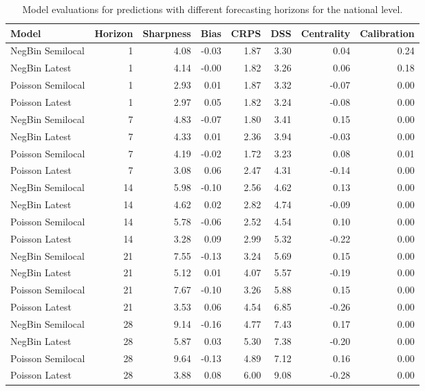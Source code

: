 \begin{table}[ht]
\centering
\begin{tabular}{lrrrrrrr}
 Model & Horizon & Sharpness & Bias & CRPS & DSS & Centrality & Calibration \\ 
  \hline
NegBin Semilocal &   1 & 4.08 & -0.03 & 1.87 & 3.30 & 0.04 & 0.24 \\ 
  NegBin Latest &   1 & 4.14 & -0.00 & 1.82 & 3.26 & 0.06 & 0.18 \\ 
  Poisson Semilocal &   1 & 2.93 & 0.01 & 1.87 & 3.32 & -0.07 & 0.00 \\ 
  Poisson Latest &   1 & 2.97 & 0.05 & 1.82 & 3.24 & -0.08 & 0.00 \\ 
   \hline
NegBin Semilocal &   7 & 4.83 & -0.07 & 1.80 & 3.41 & 0.15 & 0.00 \\ 
  NegBin Latest &   7 & 4.33 & 0.01 & 2.36 & 3.94 & -0.03 & 0.00 \\ 
  Poisson Semilocal &   7 & 4.19 & -0.02 & 1.72 & 3.23 & 0.08 & 0.01 \\ 
  Poisson Latest &   7 & 3.08 & 0.06 & 2.47 & 4.31 & -0.14 & 0.00 \\ 
   \hline
NegBin Semilocal &  14 & 5.98 & -0.10 & 2.56 & 4.62 & 0.13 & 0.00 \\ 
  NegBin Latest &  14 & 4.62 & 0.02 & 2.82 & 4.74 & -0.09 & 0.00 \\ 
  Poisson Semilocal &  14 & 5.78 & -0.06 & 2.52 & 4.54 & 0.10 & 0.00 \\ 
  Poisson Latest &  14 & 3.28 & 0.09 & 2.99 & 5.32 & -0.22 & 0.00 \\ 
   \hline
NegBin Semilocal &  21 & 7.55 & -0.13 & 3.24 & 5.69 & 0.15 & 0.00 \\ 
  NegBin Latest &  21 & 5.12 & 0.01 & 4.07 & 5.57 & -0.19 & 0.00 \\ 
  Poisson Semilocal &  21 & 7.67 & -0.10 & 3.26 & 5.88 & 0.15 & 0.00 \\ 
  Poisson Latest &  21 & 3.53 & 0.06 & 4.54 & 6.85 & -0.26 & 0.00 \\ 
   \hline
NegBin Semilocal &  28 & 9.14 & -0.16 & 4.77 & 7.43 & 0.17 & 0.00 \\ 
  NegBin Latest &  28 & 5.87 & 0.03 & 5.30 & 7.38 & -0.20 & 0.00 \\ 
  Poisson Semilocal &  28 & 9.64 & -0.13 & 4.89 & 7.12 & 0.16 & 0.00 \\ 
  Poisson Latest &  28 & 3.88 & 0.08 & 6.00 & 9.08 & -0.28 & 0.00 \\ 
   \hline
\end{tabular}
\caption{Model evaluations for predictions with different forecasting horizons for the national level.} 
\label{tab:nat_evo}
\end{table}
